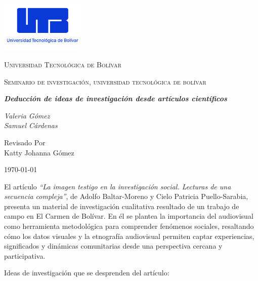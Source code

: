 \documentclass[letterpaper, 11pt]{report}
\begin{document}
\begin{titlepage}
      \centering
      \includegraphics[width=0.3\textwidth]{../../../images/logo_utb.png}\par\vspace{1cm}
      {\scshape\LARGE Universidad Tecnológica de Bolívar \par}
      \vspace{1cm}

      {\scshape\Large Seminario de investigación, universidad tecnológica de bolívar  \par}
      \vspace{2cm}

      \slshape {\Large \bfseries{} Deducción de ideas de investigación desde artículos científicos  \\}
      \vspace{3cm}

      \slshape {\itshape{} Valeria Gómez \\}
      \slshape {\itshape{} Samuel Cárdenas \\}

      \vfill
      Revisado Por \\
      Katty Johanna Gómez \\
      {\large \today\par}
\end{titlepage}

\nocite{*}

El artículo \textit{``La imagen testigo en la investigación social. Lecturas de
      una secuencia compleja''}, de Adolfo Baltar-Moreno y Cielo Patricia
Puello-Sarabia, presenta un material de investigación cualitativa resultado de
un trabajo de campo en El Carmen de Bolívar. En él se plantea la importancia
del audiovisual como herramienta metodológica para comprender fenómenos
sociales, resaltando cómo los datos visuales y la etnografía audiovisual
permiten captar experiencias, significados y dinámicas comunitarias desde una
perspectiva cercana y participativa.

Ideas de investigación que se desprenden del artículo:
\end{document}
